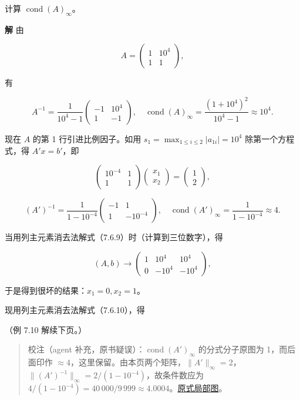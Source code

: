 \documentclass[
  10pt,
  fontset=fandol]{ctexart}
\begin{document}
计算 \(\operatorname{cond}(A)_\infty\)。

\textbf{解} 由

\[
A=\begin{pmatrix}1&10^4\\1&1\end{pmatrix},
\]

有

\[
A^{-1}=\frac1{10^4-1}\begin{pmatrix}-1&10^4\\1&-1\end{pmatrix},\quad
\operatorname{cond}(A)_\infty=\frac{(1+10^4)^2}{10^4-1}\approx10^4.
\]

现在 \(A\) 的第 1 行引进比例因子。如用
\(s_1=\max_{1\leqslant i\leqslant2}|a_{1i}|=10^4\) 除第一个方程式，得
\(A'x=b'\)，即

\[
\begin{pmatrix}10^{-4}&1\\1&1\end{pmatrix}
\begin{pmatrix}x_1\\x_2\end{pmatrix}
=\begin{pmatrix}1\\2\end{pmatrix},
\tag{7.6.10}
\]

\[
(A')^{-1}=\frac1{1-10^{-4}}\begin{pmatrix}-1&1\\1&-10^{-4}\end{pmatrix},\quad
\operatorname{cond}(A')_\infty=\frac1{1-10^{-4}}\approx4.
\]

当用列主元素消去法解式（7.6.9）时（计算到三位数字），得

\[
(A,b)\longrightarrow
\left(\begin{array}{cc|c}
1&10^4&10^4\\
0&-10^4&-10^4
\end{array}\right),
\]

于是得到很坏的结果：\(x_1=0,x_2=1\)。

现用列主元素消去法解式（7.6.10），得

（例 7.10 解续下页。）

\begin{quote}
校注（agent 补充，原书疑误）：\(\operatorname{cond}(A')_\infty\)
的分式分子原图为 1，而后面印作
\(\approx4\)，这里保留。由本页两个矩阵，\(\|A'\|_\infty=2\)，\(\|(A')^{-1}\|_\infty=2/(1-10^{-4})\)，故条件数应为
\(4/(1-10^{-4})=40\,000/9\,999\approx4.0004\)。\href{../../../staging/ch07b/assets/209-scaled-cond.png}{原式局部图}。
\end{quote}
\end{document}
